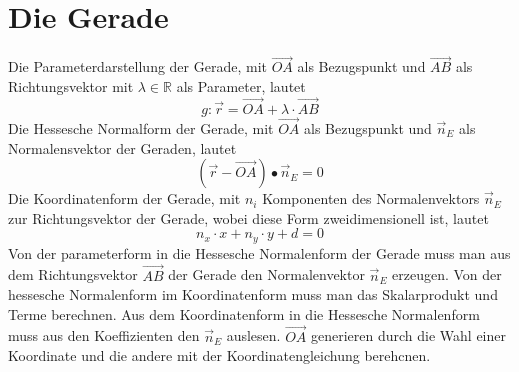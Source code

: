 \section{Die Gerade}
Die Parameterdarstellung der Gerade, mit $\overrightarrow{OA}$ als Bezugspunkt und $\overrightarrow{AB}$ als Richtungsvektor mit $\lambda\in \mathbb{R}$ als Parameter, lautet
\begin{equation}
\boxed{g:\overrightarrow{r}=\overrightarrow{OA}+\lambda\cdot \overrightarrow{AB}}
\end{equation}
Die Hessesche Normalform der Gerade, mit $\overrightarrow{OA}$ als Bezugspunkt und $\overrightarrow{n}_E$ als Normalensvektor der Geraden, lautet
\begin{equation}
\boxed{\left(\overrightarrow{r}-\overrightarrow{OA}\right)\bullet \overrightarrow{n}_E=0}
\end{equation}
Die Koordinatenform der Gerade, mit $n_i$ Komponenten des Normalenvektors $\overrightarrow{n}_E$ zur Richtungsvektor der Gerade, wobei diese Form zweidimensionell ist, lautet
\begin{equation}
\boxed{n_x\cdot x+n_y\cdot y+d=0}
\end{equation}
Von der parameterform in die Hessesche Normalenform der Gerade muss man aus dem Richtungsvektor $\overrightarrow{AB}$ der Gerade den Normalenvektor $\overrightarrow{n}_E$ erzeugen.\newline\newline
Von der hessesche Normalenform im Koordinatenform muss man das Skalarprodukt und Terme berechnen.
\newline\newline
Aus dem Koordinatenform in die Hessesche Normalenform muss aus den Koeffizienten den $\overrightarrow{n}_E$ auslesen. $\overrightarrow{OA}$ generieren durch die Wahl einer Koordinate und die andere mit der Koordinatengleichung berehcnen.
